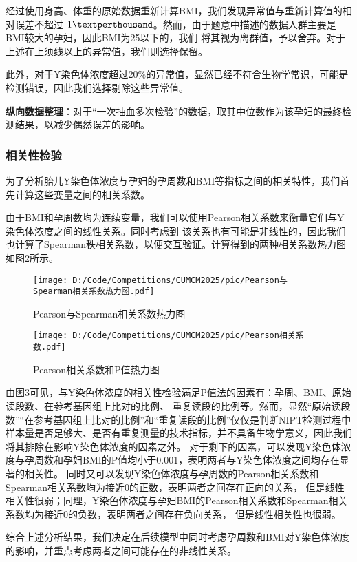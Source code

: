 \documentclass{cumcmthesis}
\begin{document}
                经过使用身高、体重的原始数据重新计算BMI，我们发现异常值与重新计算值的相对误差不超过
                $1\textperthousand$。然而，由于题意中描述的数据人群主要是BMI较大的孕妇，因此BMI为25以下的，我们
                将其视为离群值，予以舍弃。对于上述在上须线以上的异常值，我们则选择保留。
                \par
                此外，对于Y染色体浓度超过$20\%$的异常值，显然已经不符合生物学常识，可能是检测错误，因此我们选择剔除这些异常值。
                \par
                \textbf{纵向数据整理}：对于“一次抽血多次检验”的数据，取其中位数作为该孕妇的最终检测结果，以减少偶然误差的影响。
                

            \subsubsection{相关性检验}
                为了分析胎儿Y染色体浓度与孕妇的孕周数和BMI等指标之间的相关特性，我们首先计算这些变量之间的相关系数。
                \par
                由于BMI和孕周数均为连续变量，我们可以使用Pearson相关系数来衡量它们与Y染色体浓度之间的线性关系。同时考虑到
                该关系也有可能是非线性的，因此我们也计算了Spearman秩相关系数，以便交互验证。计算得到的两种相关系数热力图如图2所示。
                \begin{figure}[htbp]
                \centering
                \texttt{[image: D:/Code/Competitions/CUMCM2025/pic/Pearson与Spearman相关系数热力图.pdf]}
                \caption{Pearson与Spearman相关系数热力图}
                \label{fi2}
                \end{figure}
                \begin{figure}[htbp]
                \centering
                \texttt{[image: D:/Code/Competitions/CUMCM2025/pic/Pearson相关系数.pdf]}
                \caption{Pearson相关系数和P值热力图}
                \label{fi3}
                \end{figure}
                \par
                由图3可见，与Y染色体浓度的相关性检验满足P值法的因素有：孕周、BMI、原始读段数、在参考基因组上比对的比例、
                重复读段的比例等。然而，显然“原始读段数”“在参考基因组上比对的比例”和“重复读段的比例”仅仅是判断NIPT检测过程中
                样本量是否足够大、是否有重复测量的技术指标，并不具备生物学意义，因此我们将其排除在影响Y染色体浓度的因素之外。
                对于剩下的因素，可以发现Y染色体浓度与孕周数和孕妇BMI的P值均小于0.001，表明两者与Y染色体浓度之间均存在显著的相关性。
                同时又可以发现Y染色体浓度与孕周数的Pearson相关系数和Spearman相关系数均为接近0的正数，表明两者之间存在正向的关系，
                但是线性相关性很弱；同理，Y染色体浓度与孕妇BMI的Pearson相关系数和Spearman相关系数均为接近0的负数，表明两者之间存在负向关系，
                但是线性相关性也很弱。
                \par
                综合上述分析结果，我们决定在后续模型中同时考虑孕周数和BMI对Y染色体浓度的影响，并重点考虑两者之间可能存在的非线性关系。
\end{document}
